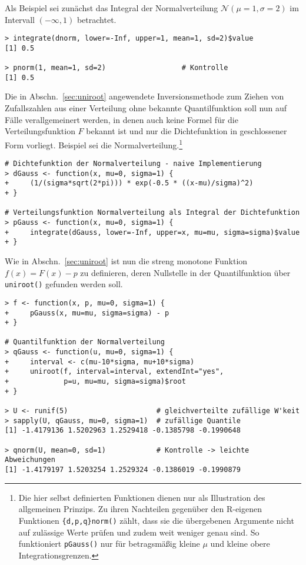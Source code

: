 Als Beispiel sei zunächst das Integral der Normalverteilung $\mathcal{N}(\mu=1, \sigma=2)$ im Intervall $(-\infty, 1)$ betrachtet.
\begin{lstlisting}
> integrate(dnorm, lower=-Inf, upper=1, mean=1, sd=2)$value
[1] 0.5

> pnorm(1, mean=1, sd=2)                  # Kontrolle
[1] 0.5
\end{lstlisting}

Die in Abschn.\ \ref{sec:uniroot} angewendete Inversionsmethode zum Ziehen von Zufallszahlen aus einer Verteilung ohne bekannte Quantilfunktion soll nun auf Fälle verallgemeinert werden, in denen auch keine Formel für die Verteilungsfunktion $F$ bekannt ist und nur die Dichtefunktion in geschlossener Form vorliegt. Beispiel sei die Normalverteilung.\footnote{Die hier selbst definierten Funktionen dienen nur als Illustration des allgemeinen Prinzips. Zu ihren Nachteilen gegenüber den R-eigenen Funktionen \texttt{\{d,p,q\}norm()} zählt, dass sie die übergebenen Argumente nicht auf zulässige Werte prüfen und zudem weit weniger genau sind. So funktioniert \lstinline!pGauss()! nur für betragsmäßig kleine $\mu$ und kleine obere Integrationsgrenzen.}
\begin{lstlisting}
# Dichtefunktion der Normalverteilung - naive Implementierung
> dGauss <- function(x, mu=0, sigma=1) {
+     (1/(sigma*sqrt(2*pi))) * exp(-0.5 * ((x-mu)/sigma)^2)
+ }

# Verteilungsfunktion Normalverteilung als Integral der Dichtefunktion
> pGauss <- function(x, mu=0, sigma=1) {
+     integrate(dGauss, lower=-Inf, upper=x, mu=mu, sigma=sigma)$value
+ }
\end{lstlisting}

Wie in Abschn.\ \ref{sec:uniroot} ist nun die streng monotone Funktion $f(x) = F(x) - p$ zu definieren, deren Nullstelle in der Quantilfunktion über \lstinline!uniroot()! gefunden werden soll.
\begin{lstlisting}
> f <- function(x, p, mu=0, sigma=1) {
+     pGauss(x, mu=mu, sigma=sigma) - p
+ }

# Quantilfunktion der Normalverteilung  
> qGauss <- function(u, mu=0, sigma=1) {
+     interval <- c(mu-10*sigma, mu+10*sigma)
+     uniroot(f, interval=interval, extendInt="yes",
+             p=u, mu=mu, sigma=sigma)$root
+ }

> U <- runif(5)                     # gleichverteilte zufällige W'keit
> sapply(U, qGauss, mu=0, sigma=1)  # zufällige Quantile
[1] -1.4179136 1.5202963 1.2529418 -0.1385798 -0.1990648

> qnorm(U, mean=0, sd=1)            # Kontrolle -> leichte Abweichungen
[1] -1.4179197 1.5203254 1.2529324 -0.1386019 -0.1990879
\end{lstlisting}

